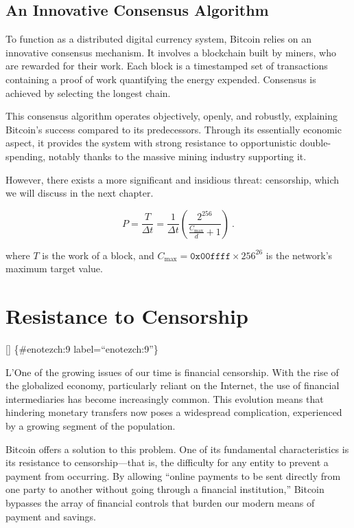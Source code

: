 \documentclass[
  a5paper,
  smalldemyvopaper,10pt,twoside,onecolumn,openright,extrafontsizes,hidelinks]{memoir}
\begin{document}
\section*{An Innovative Consensus
Algorithm}\label{un-algorithme-de-consensus-novateur}


To function as a distributed digital currency system, Bitcoin relies on
an innovative consensus mechanism. It involves a blockchain built by
miners, who are rewarded for their work. Each block is a timestamped set
of transactions containing a proof of work quantifying the energy
expended. Consensus is achieved by selecting the longest chain.

This consensus algorithm operates objectively, openly, and robustly,
explaining Bitcoin's success compared to its predecessors. Through its
essentially economic aspect, it provides the system with strong
resistance to opportunistic double-spending, notably thanks to the
massive mining industry supporting it.

However, there exists a more significant and insidious threat:
censorship, which we will discuss in the next chapter.

\[P = \frac{T}{\Delta t} = \frac{1}{\Delta t} \left( \frac{2^{256}}{\frac{C_{\mathrm{max}}}{d} + 1} \right)~.\]

where \(T\) is the work of a block, and
\(C_{\mathrm{max}} = \mathtt{0x00ffff} \times 256^{26}\) is the
network's maximum target value.


\chapter{Resistance to Censorship}\label{ch:censure}

{[}{]} \{\#enotezch:9 label=``enotezch:9''\}

{L}\textsc{'}One of the growing issues of our time is financial
censorship. With the rise of the globalized economy, particularly
reliant on the Internet, the use of financial intermediaries has become
increasingly common. This evolution means that hindering monetary
transfers now poses a widespread complication, experienced by a growing
segment of the population.

Bitcoin offers a solution to this problem. One of its fundamental
characteristics is its resistance to censorship---that is, the
difficulty for any entity to prevent a payment from occurring. By
allowing ``online payments to be sent directly from one party to another
without going through a financial institution,'' Bitcoin bypasses the
array of financial controls that burden our modern means of payment and
savings.
\end{document}

